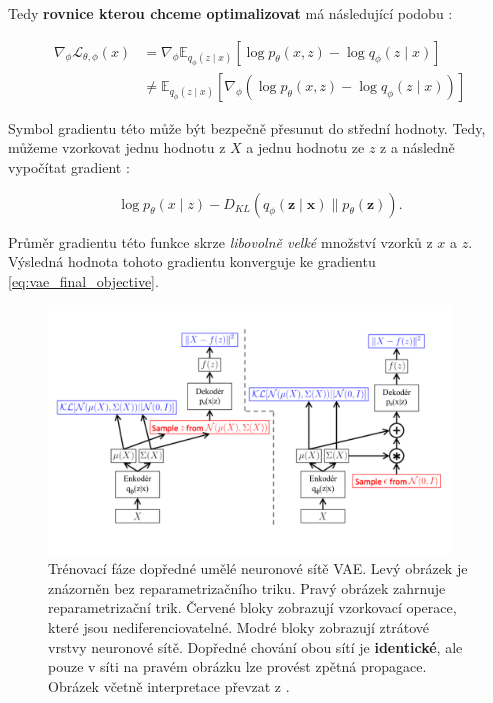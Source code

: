Tedy \textbf{rovnice kterou chceme optimalizovat} má následující podobu \cite{Kingma2014}:

\begin{align}
   \nabla_\phi \mathcal{L}_{\theta,\phi}(x) &= \nabla_\phi \mathds{E}_{q_\phi(z\mid x)} \left[ \log p_\theta (x, z) - \log q_\phi (z\mid x) \right] \label{eq:vae_final_objective} \\
                                            &\neq \mathds{E}_{q_\phi(z\mid x)} \left[ \nabla_\phi (\log p_\theta (x, z) - \log q_\phi (z\mid x) ) \right] \label{eq:vae_final_objective_dependent_gradient}
\end{align}

Symbol gradientu této může být bezpečně přesunut do střední hodnoty.
Tedy, můžeme vzorkovat jednu hodnotu z $X$ a jednu hodnotu ze $z$ z a následně vypočítat gradient \cite{Doersch2021}:

\begin{equation} \label{eq:sample_gradient}
    \log p_\theta(x \mid z) - D_{KL}(q_\phi(\textbf{z}\mid\textbf{x})\parallel p_\theta(\textbf{z})). 
\end{equation}

Průměr gradientu této funkce skrze \emph{libovolně velké} množství vzorků z $x$ a $z$. Výsledná hodnota tohoto gradientu konverguje ke gradientu \autoref{eq:vae_final_objective}. \cite{Doersch2021}

\begin{figure}[H]
    \centering
    \includegraphics[width=0.95\textwidth]{figures/vae_backpropagation.pdf}
    \caption{Trénovací fáze dopředné umělé neuronové sítě VAE. Levý obrázek je znázorněn bez reparametrizačního triku. Pravý obrázek zahrnuje reparametrizační trik. Červené bloky zobrazují vzorkovací operace, které jsou nediferenciovatelné. Modré bloky zobrazují ztrátové vrstvy neuronové sítě. Dopředné chování obou sítí je \textbf{identické}, ale pouze v síti na pravém obrázku lze provést zpětná propagace. Obrázek včetně interpretace převzat z \cite{Doersch2021}.}
    \label{fig:vae_backpropagation}
\end{figure}

